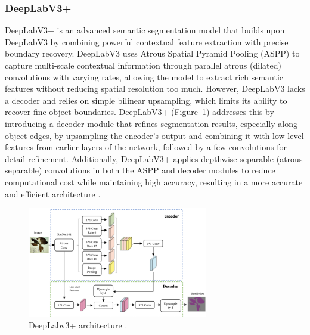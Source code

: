 \subsubsection{DeepLabV3+}
DeepLabV3+ is an advanced semantic segmentation model that builds upon DeepLabV3 by combining powerful contextual feature extraction with precise boundary recovery. DeepLabV3 uses Atrous Spatial Pyramid Pooling (ASPP) to capture multi-scale contextual information through parallel atrous (dilated) convolutions with varying rates, allowing the model to extract rich semantic features without reducing spatial resolution too much. However, DeepLabV3 lacks a decoder and relies on simple bilinear upsampling, which limits its ability to recover fine object boundaries. DeepLabV3+ (Figure~\ref{fig:DeepLabv3+}) addresses this by introducing a decoder module that refines segmentation results, especially along object edges, by upsampling the encoder’s output and combining it with low-level features from earlier layers of the network, followed by a few convolutions for detail refinement. Additionally, DeepLabV3+ applies depthwise separable (atrous separable) convolutions in both the ASPP and decoder modules to reduce computational cost while maintaining high accuracy, resulting in a more accurate and efficient architecture \parencite{chen2018encoder}.
\begin{figure}[H] %
    \centering
    \includegraphics[width=0.7\textwidth]{chapters/chapter1/images/Figure22.png}
    \caption{DeepLabv3+ architecture \parencite{hussein2020semantic}.}
    \label{fig:DeepLabv3+}
\end{figure}



